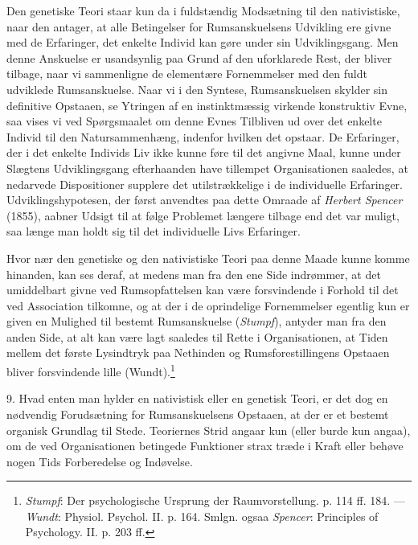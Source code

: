 \documentclass[12pt,a4paper,openany]{book}
\newcommand{\opage}[1]{\marginnote{\footnotesize\textit{[#1]}}}
\begin{document}
Den genetiske Teori staar kun da i fuldstændig Modsætning til den
nativistiske, naar den antager, at alle Betingelser for Rumsanskuelsens
Udvikling ere givne med de Erfaringer, det enkelte Individ kan gøre
under sin Udviklingsgang. Men denne Anskuelse er usandsynlig paa Grund
af den uforklarede Rest, der bliver tilbage, naar vi sammenligne de
elementære Fornemmelser med den fuldt udviklede Rumsanskuelse. Naar vi i
den Syntese, Rumsanskuelsen skylder sin definitive Opstaaen, se Ytringen
af en instinktmæssig virkende konstruktiv Evne, saa vises vi ved
Spørgsmaalet om denne Evnes Tilbliven ud over det enkelte Individ til
den Natursammenhæng, indenfor hvilken det opstaar. De Erfaringer,
\opage{249}der i det enkelte Individs Liv ikke kunne føre til det
angivne Maal, kunne under Slægtens Udviklingsgang efterhaanden have
tillempet Organisationen saaledes, at nedarvede Dispositioner supplere
det utilstrækkelige i de individuelle Erfaringer. Udviklingshypotesen,
der først anvendtes paa dette Omraade af \emph{Herbert Spencer} (1855),
aabner Udsigt til at følge Problemet længere tilbage end det var muligt,
saa længe man holdt sig til det individuelle Livs Erfaringer.

Hvor nær den genetiske og den nativistiske Teori paa denne Maade kunne
komme hinanden, kan ses deraf, at medens man fra den ene Side indrømmer,
at det umiddelbart givne ved Rumsopfattelsen kan være forsvindende i
Forhold til det ved Association tilkomne, og at der i de oprindelige
Fornemmelser egentlig kun er given en Mulighed til bestemt Rumsanskuelse
(\emph{Stumpf}), antyder man fra den anden Side, at alt kan være lagt
saaledes til Rette i Organisationen, at Tiden mellem det første
Lysindtryk paa Nethinden og Rumsforestillingens Opstaaen bliver
forsvindende lille (Wundt).\footnote[1]{\emph{Stumpf}: Der
psychologische Ursprung der Raumvorstellung. p. 114 ff. 184. ---
\emph{Wundt}: Physiol. Psychol. II. p. 164. Smlgn. ogsaa \emph{Spencer}:
Principles of Psychology. II. p. 203 ff.}

9. Hvad enten man hylder en nativistisk eller en genetisk Teori, er det
dog en nødvendig Forudsætning for Rumsanskuelsens Opstaaen, at der er et
bestemt organisk Grundlag til Stede. Teoriernes Strid angaar kun (eller
burde kun angaa), om de ved Organisationen betingede Funktioner strax
træde i Kraft eller behøve nogen Tids Forberedelse og Indøvelse.
\end{document}
